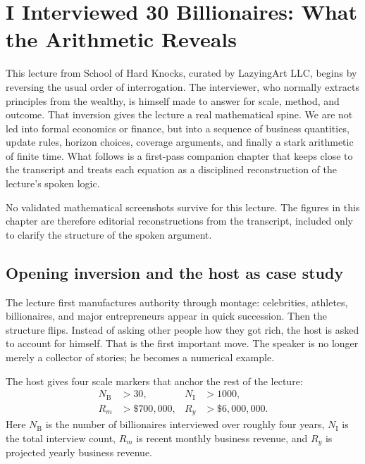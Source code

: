\chapter{I Interviewed 30 Billionaires: What the Arithmetic Reveals}

This lecture from School of Hard Knocks, curated by LazyingArt LLC, begins by reversing the usual order of interrogation. The interviewer, who normally extracts principles from the wealthy, is himself made to answer for scale, method, and outcome. That inversion gives the lecture a real mathematical spine. We are not led into formal economics or finance, but into a sequence of business quantities, update rules, horizon choices, coverage arguments, and finally a stark arithmetic of finite time. What follows is a first-pass companion chapter that keeps close to the transcript and treats each equation as a disciplined reconstruction of the lecture's spoken logic.

\begin{remark}
No validated mathematical screenshots survive for this lecture. The figures in this chapter are therefore editorial reconstructions from the transcript, included only to clarify the structure of the spoken argument.
\end{remark}

\section{Opening inversion and the host as case study}

The lecture first manufactures authority through montage: celebrities, athletes, billionaires, and major entrepreneurs appear in quick succession. Then the structure flips. Instead of asking other people how they got rich, the host is asked to account for himself. That is the first important move. The speaker is no longer merely a collector of stories; he becomes a numerical example.

The host gives four scale markers that anchor the rest of the lecture:
\begin{align}
N_{\mathrm{B}} &> 30, &
N_{\mathrm{I}} &> 1000, \\
R_m &> \$700{,}000, &
R_y &> \$6{,}000{,}000.
\end{align}
Here \(N_{\mathrm{B}}\) is the number of billionaires interviewed over roughly four years, \(N_{\mathrm{I}}\) is the total interview count, \(R_m\) is recent monthly business revenue, and \(R_y\) is projected yearly business revenue.

